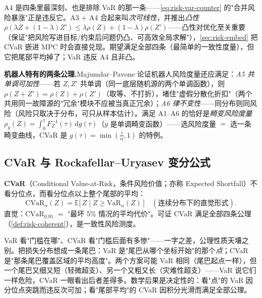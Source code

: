 A4 是四条里最深刻、也是排除 VaR 的那一条——\cref{eq:risk-var-counter} 的"合并风险暴涨"正是违反它。A3 + A4 合起来叫\emph{次可线性}，并推出\emph{凸性} $\rho(\lambda Z+(1-\lambda)Z')\le\lambda\rho(Z)+(1-\lambda)\rho(Z')$——凸性对优化至关重要（保证"把风险写进目标/约束后问题仍凸、可高效全局求解"），\cref{sec:risk-embed} 把 CVaR 嵌进 MPC 时会直接兑现。期望满足全部四条（最简单的一致性度量），但它把尾部平均掉了；VaR 违反 A4 且非凸。

\begin{note}
\textbf{机器人特有的两条公理.}\;Majumdar--Pavone\cite{majumdar2017risk} 论证机器人风险度量还应满足：\emph{A5 共单调可加性}——若 $Z,Z'$ 共单调（同一底层随机源的两个单调函数），则 $\rho(Z+Z')=\rho(Z)+\rho(Z')$（取等、不打折），堵住"虚假分散化折扣"（两个共用同一故障源的"冗余"模块不应被当真正冗余）；\emph{A6 律不变性}——同分布则同风险（风险只取决于分布，可只从样本估计）。满足 A1--A6 的恰好是\emph{畸变风险度量} $\rho_g(Z)=\int_0^1 F_Z^{-1}(\tau)\,\mathrm{d}g(\tau)$（$g$ 是单调畸变函数）——选风险度量 $=$ 选一条畸变曲线，CVaR 是 $g(\tau)=\min(\tfrac\tau\alpha,1)$ 的特例。
\end{note}

\subsection{CVaR 与 Rockafellar--Uryasev 变分公式}
\label{sec:risk-cvar}

\begin{definition}[CVaR]\label{def:risk-cvar}
\textbf{CVaR}（Conditional Value-at-Risk，条件风险价值；亦称 Expected Shortfall）不看分位点，而看分位点以上整个尾部的平均：
\begin{equation}
  \mathrm{CVaR}_\alpha(Z)=\mathbb{E}\big[\,Z\mid Z\ge\mathrm{VaR}_\alpha(Z)\,\big]\quad(\text{连续分布下的直觉形式}).
  \label{eq:risk-cvar-intuitive}
\end{equation}
直觉：$\mathrm{CVaR}_{0.95}$ $=$ "最坏 5\% 情况的平均代价"。可证 CVaR 满足全部四条公理（\cref{def:risk-coherent}），是一致性风险测度。
\end{definition}

\begin{insight}
VaR 看"门槛在哪"、CVaR 看"门槛后面有多惨"——一字之差，公理性质天壤之别。把损失分布想成一条尾巴：VaR 是"尾巴从哪个坐标开始"的那个\emph{点}；CVaR 是"那条尾巴覆盖区域的平均高度"。两个方案可能 VaR 相同（尾巴起点一样），但一个尾巴又细又短（轻微超支）、另一个又粗又长（灾难性超支）——VaR 说它们一样危险，CVaR 一眼看出后者差得多。数学后果是决定性的：看"点"的 VaR 因分位点突跳而违反次可加；看"尾部平均"的 CVaR 因积分光滑而满足全部公理。
\end{insight}

